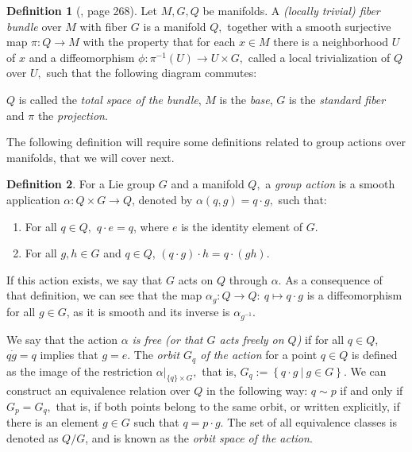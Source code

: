 \documentclass[12pt, letterpaper, reqno]{amsart}
\theoremstyle{definition}
\newtheorem{df}{Definition}
\theoremstyle{plain}
\theoremstyle{remark}
\begin{document}
\begin{df}[\cite{lee2003introduction}, page 268]
	Let $ M, G, Q $ be manifolds. A \textit{(locally trivial) fiber bundle} over $ M $ with fiber $ G $ is a manifold $ Q, $ together with a smooth surjective map $ \pi: Q \rightarrow {M}
$ with the property that for each $ x\in M $ there is a neighborhood $ U $ of $ x $ and a diffeomorphism $ \phi:\pi^{-1}(U) \rightarrow {U\times G,}
 $ called a local trivialization of $ Q $ over $ U, $ such that the following diagram commutes:
 \begin{center}
 \end{center}
 $ Q $ is called the \textit{total space of the bundle}, $ M $ is the \textit{base}, $ G $ is the \textit{standard fiber}  and $ \pi $ the \textit{projection}.   
\end{df}

The following definition will require some definitions related to group actions over manifolds, that we will cover next. 

\begin{df}
For a Lie group $ G $ and a manifold $ Q, $ a \textit{group action} is a smooth application $ \alpha:  Q\times G \rightarrow Q $, denoted by $ \alpha(q,g) = q \cdot g, $ such that:

\begin{enumerate}
	\item For all $ q\in Q, $ $ q\cdot e = q $, where $ e $ is the identity element of $ G. $   
	\item For all $ g,h\in G $ and $ q\in Q $, $ (q\cdot g) \cdot h =q\cdot(gh). $ 
\end{enumerate}

\end{df}
If this action exists, we say that $ G $ acts on $ Q $ through $ \alpha. $ As a consequence of that definition, we can see that the map $ \alpha_g: Q \rightarrow Q: \ q\mapsto q\cdot g$ is a diffeomorphism for all $ g\in G $, as it is smooth and its inverse is $ \alpha_{g^{-1}}. $

We say that the action $ \alpha $ \textit{is free (or that $ G $ acts freely on $ Q $)} if for all $ q\in Q $, $ q\dot g =q$   implies that $ g=e. $ The \textit{orbit $ G_q $ of the action}  for a point $ q\in Q $  is defined as the image of the restriction $\alpha|_{\{q\}\times G},$  that is, $ G_q := \left\{q\cdot g \ | \ g\in G \right\}. $ We can construct an equivalence relation over $ Q $ in the following way: $ q\sim p $ if and only if $ G_p = G_q, $ that is, if both points belong to the same orbit, or written explicitly, if there is an element $ g\in G $ such that $ q = p\cdot g. $ The set of all equivalence classes is denoted as $ Q/G $, and is known as the \textit{orbit space of the action}.     
\end{document}
